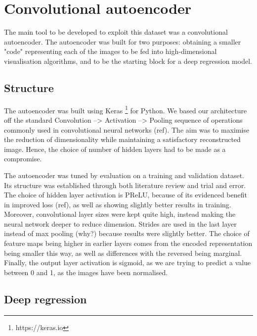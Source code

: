 
\section{Convolutional autoencoder}

The main tool to be developed to exploit this dataset was a convolutional autoencoder. The autoencoder was built for two purposes: obtaining a smaller "code" representing each of the images to be fed into high-dimensional visualisation algorithms, and to be the starting block for a deep regression model.

\subsection{Structure}

The autoencoder was built using Keras \footnote{https://keras.io} for Python. We based our architecture off the standard Convolution --> Activation --> Pooling sequence of operations commonly used in convolutional neural networks (ref). The aim was to maximise the reduction of dimensionality while maintaining a satisfactory reconstructed image. Hence, the choice of number of hidden layers had to be made as a compromise.

The autoencoder was tuned by evaluation on a training and validation dataset. Its structure was established through both literature review and trial and error. The choice of hidden layer activation is PReLU, because of its evidenced benefit in improved loss (ref), as well as showing slightly better results in training. Moreover, convolutional layer sizes were kept quite high, instead making the neural network deeper to reduce dimension. Strides are used in the last layer instead of max pooling (why?) because results were slightly better. The choice of feature maps being higher in earlier layers comes from the encoded representation being smaller this way, as well as differences with the reversed being marginal. Finally, the output layer activation is sigmoid, as we are trying to predict a value between 0 and 1, as the images have been normalised. 

\subsection{Deep regression}

